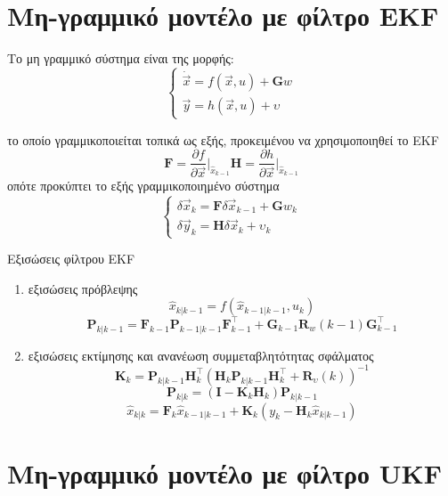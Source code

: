 \documentclass[10pt]{article}
\begin{document}
\section{Μη-γραμμικό μοντέλο με φίλτρο \textlatin{EKF}}

Το μη γραμμικό σύστημα είναι της μορφής:
\[
\begin{cases}
\dot{\vec{x}} = f(\vec{x}, u) + \mathbf{G}w \\
\vec{y} = h(\vec{x}, u) + υ
\end{cases}
\]

το οποίο γραμμικοποιείται τοπικά ως εξής, προκειμένου να χρησιμοποιηθεί το \textlatin{EKF}
\[ 
\mathbf{F} = \frac{\partial f}{\partial \vec{x}} \biggr\rvert_{\hat{x}_{k-1}}^{} 
\mathbf{H} = \frac{\partial h}{\partial \vec{x}} \biggr\rvert_{\hat{x}_{k-1}}^{} 
\]
οπότε προκύπτει το εξής γραμμικοποιημένο σύστημα
\[
\begin{cases}
\delta \vec{x}_k = \mathbf{F}\delta\vec{x}_{k-1} + \mathbf{G}w_k \\
\delta \vec{y}_k = \mathbf{H}\delta\vec{x}_k + υ_k
\end{cases}
\]


Εξισώσεις φίλτρου \textlatin{EKF}
\begin{enumerate}
	\item εξισώσεις πρόβλεψης
	\[ \hat{x}_{k|k-1} = f(\hat{x}_{k-1|k-1}, u_k ) \]
	\[ \mathbf{P}_{k|k-1} = \mathbf{F}_{k-1}\mathbf{P}_{k-1|k-1}\mathbf{F}_{k-1}^{\top} + \mathbf{G}_{k-1}\mathbf{R}_{w}(k-1)\mathbf{G}_{k-1}^{\top} \]
	\item εξισώσεις εκτίμησης και ανανέωση συμμεταβλητότητας σφάλματος
	\[ \mathbf{K}_k = \mathbf{P}_{k|k-1} \mathbf{H}_k^\top ( \mathbf{H}_k \mathbf{P}_{k|k-1} \mathbf{H}_k^\top + \mathbf{R}_υ(k) )^{-1} \]
	\[ \mathbf{P}_{k|k} = ( \mathbf{I} - \mathbf{K}_k\mathbf{H}_k ) \mathbf{P}_{k|k-1} \]
	\[ \hat{x}_{k|k} = \mathbf{F}_{k}\hat{x}_{k-1|k-1} + \mathbf{K}_k (y_k - \mathbf{H}_k \hat{x}_{k|k-1} ) \]
\end{enumerate}



\section{Μη-γραμμικό μοντέλο με φίλτρο \textlatin{UKF}}
\end{document}
